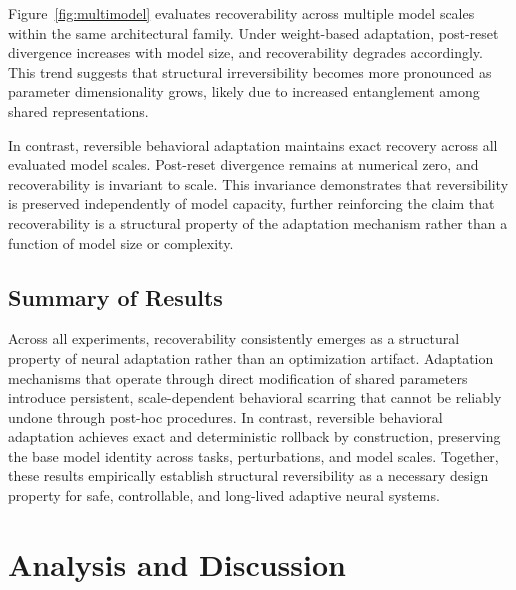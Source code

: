 \documentclass[10pt]{article}
\begin{document}
	\begin{table}[H]
		\centering
		\footnotesize
		
		\vspace{5pt}
		\caption{Post-reset divergence and recoverability across model sizes.}
		\label{tab:multimodelrecov}
	\end{table}
	
	\FloatBarrier
	
	Figure~\ref{fig:multimodel} evaluates recoverability across multiple model scales within the same architectural family. Under weight-based adaptation, post-reset divergence increases with model size, and recoverability degrades accordingly. This trend suggests that structural irreversibility becomes more pronounced as parameter dimensionality grows, likely due to increased entanglement among shared representations.
	
	In contrast, reversible behavioral adaptation maintains exact recovery across all evaluated model scales. Post-reset divergence remains at numerical zero, and recoverability is invariant to scale. This invariance demonstrates that reversibility is preserved independently of model capacity, further reinforcing the claim that recoverability is a structural property of the adaptation mechanism rather than a function of model size or complexity.
	
	\subsection{Summary of Results}
	
	Across all experiments, recoverability consistently emerges as a structural property of neural adaptation rather than an optimization artifact. Adaptation mechanisms that operate through direct modification of shared parameters introduce persistent, scale-dependent behavioral scarring that cannot be reliably undone through post-hoc procedures. In contrast, reversible behavioral adaptation achieves exact and deterministic rollback by construction, preserving the base model identity across tasks, perturbations, and model scales. Together, these results empirically establish structural reversibility as a necessary design property for safe, controllable, and long-lived adaptive neural systems.
	
	
	\section{Analysis and Discussion}
	\label{sec:analysis}
	
\end{document}

